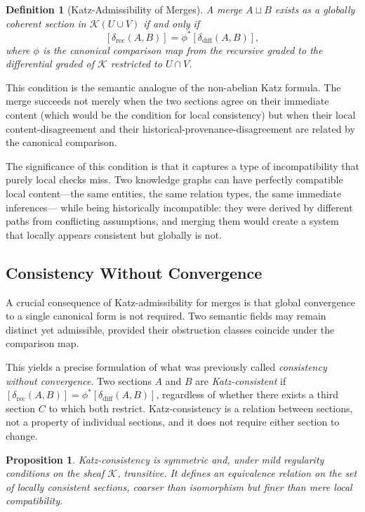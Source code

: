 \documentclass[12pt]{article}
\newtheorem{definition}{Definition}
\newtheorem{proposition}{Proposition}
\begin{document}
\begin{definition}[Katz-Admissibility of Merges]
A merge $A \sqcup B$ exists as a globally coherent section in $\mathcal{K}(U \cup V)$
if and only if
\[
[\delta_{\mathrm{rec}}(A,B)] = \phi^*[\delta_{\mathrm{diff}}(A,B)],
\]
where $\phi$ is the canonical comparison map from the recursive graded to the
differential graded of $\mathcal{K}$ restricted to $U \cap V$.
\end{definition}

This condition is the semantic analogue of the non-abelian Katz formula. The merge
succeeds not merely when the two sections agree on their immediate content (which
would be the condition for local consistency) but when their local content-disagreement
and their historical-provenance-disagreement are related by the canonical comparison.

The significance of this condition is that it captures a type of incompatibility that
purely local checks miss. Two knowledge graphs can have perfectly compatible local
content---the same entities, the same relation types, the same immediate inferences---
while being historically incompatible: they were derived by different paths from
conflicting assumptions, and merging them would create a system that locally appears
consistent but globally is not.

\subsection{Consistency Without Convergence}

A crucial consequence of Katz-admissibility for merges is that global convergence to a
single canonical form is not required. Two semantic fields may remain distinct yet
admissible, provided their obstruction classes coincide under the comparison map.

This yields a precise formulation of what was previously called \emph{consistency
without convergence}. Two sections $A$ and $B$ are \emph{Katz-consistent} if
$[\delta_{\mathrm{rec}}(A,B)] = \phi^*[\delta_{\mathrm{diff}}(A,B)]$, regardless of
whether there exists a third section $C$ to which both restrict. Katz-consistency is a
relation between sections, not a property of individual sections, and it does not
require either section to change.

\begin{proposition}
Katz-consistency is symmetric and, under mild regularity conditions on the sheaf
$\mathcal{K}$, transitive. It defines an equivalence relation on the set of
locally consistent sections, coarser than isomorphism but finer than mere local
compatibility.
\end{proposition}
\end{document}

